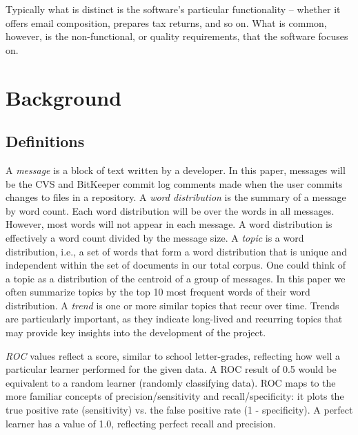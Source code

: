 \documentclass[10pt, conference, compsocconf]{IEEEtran}
\begin{document}
Typically what is distinct is the software's particular functionality -- whether it offers email composition, prepares tax returns, and so on. What is common, however, is the non-functional, or quality requirements, that the software focuses on. 

\section{Background}

\subsection{Definitions}
A \emph{message} is a block of text written by a developer. In this
paper, messages will be the CVS and BitKeeper commit log comments made
when the user commits changes to files in a repository. A \emph{word
  distribution} is the summary of a message by word count. Each word
distribution will be over the words in all messages. However, most
words will not appear in each message. A word distribution is effectively
a word count divided by the message size. A \emph{topic} is a word
distribution, i.e., a set of words that form a word distribution that is
unique and independent within the set of documents in our total
corpus. One could think of a topic as a distribution of the centroid
of a group of messages. In this paper we often summarize topics by the
top 10 most frequent words of their word distribution.  A \emph{trend}
is one or more similar topics that recur over time.  Trends are
particularly important, as they indicate long-lived and recurring
topics that may provide key insights into the development of the
project.

\emph{ROC} values reflect a score, similar to school letter-grades, reflecting how well a particular learner performed for the given data. A ROC result of 0.5 would be equivalent to a random learner (randomly classifying data). ROC maps to the more familiar concepts of precision/sensitivity and recall/specificity: it plots the true positive rate (sensitivity) vs. the false positive rate (1 - specificity). A perfect learner has a value of 1.0, reflecting perfect recall and precision.
\end{document}

